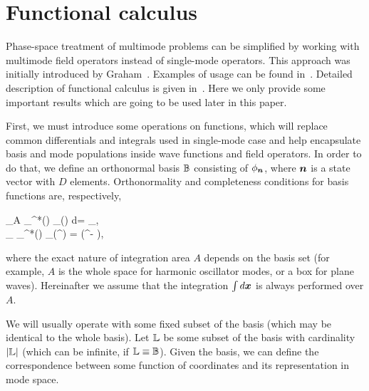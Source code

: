 \section{Functional calculus}

Phase-space treatment of multimode problems can be simplified by working with multimode field operators instead of single-mode operators.
This approach was initially introduced by Graham~\cite{Graham1970,Graham1970a}.
Examples of usage can be found in~\cite{Steel1998,Norrie2006a}.
Detailed description of functional calculus is given in~\cite{Dalton2011}.
Here we only provide some important results which are going to be used later in this paper.

First, we must introduce some operations on functions, which will replace common differentials and integrals used in single-mode case and help encapsulate basis and mode populations inside wave functions and field operators.
In order to do that, we define an orthonormal basis $\mathbb{B}$ consisting of $\phi_{\boldsymbol{n}}$, where $\boldsymbol{n}$ is a state vector with $D$ elements.
Orthonormality and completeness conditions for basis functions are, respectively,
\begin{eqns}
	\int\limits_A \phi_{\nvec}^*(\xvec) \phi_{\mvec}(\xvec) d\xvec = \delta_{\nvec\mvec}, \\
	\sum_{\nvec} \phi_{\nvec}^*(\xvec) \phi_{\nvec}(\xvec^\prime) = \delta(\xvec^\prime - \xvec),
\end{eqns}
where the exact nature of integration area $A$ depends on the basis set (for example, $A$ is the whole space for harmonic oscillator modes, or a box for plane waves).
Hereinafter we assume that the integration $\int d\boldsymbol{x}$ is always performed over $A$.

We will usually operate with some fixed subset of the basis (which may be identical to the whole basis).
Let $\mathbb{L}$ be some subset of the basis with cardinality $|\mathbb{L}|$ (which can be infinite, if $\mathbb{L} \equiv \mathbb{B}$).
Given the basis, we can define the correspondence between some function of coordinates and its representation in mode space.

